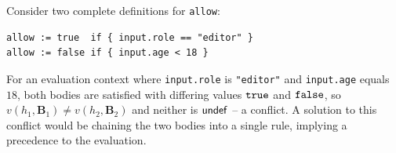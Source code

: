 \begin{example}
  Consider two complete definitions for \texttt{allow}:
  \begin{lstlisting}[language=Rego]
allow := true  if { input.role == "editor" }
allow := false if { input.age < 18 }
\end{lstlisting}
  For an evaluation context where \texttt{input.role} is \texttt{"editor"} and \texttt{input.age} equals $18$, both bodies are satisfied with
  differing values $\texttt{true}$ and $\texttt{false}$, so $v(h_1, \mathbf{B}_1) \neq v(h_2, \mathbf{B}_2)$
  and neither is $\mathsf{undef}$ -- a conflict.
  A solution to this conflict would be chaining the two bodies into a single rule, implying a precedence to the evaluation.
\end{example}
